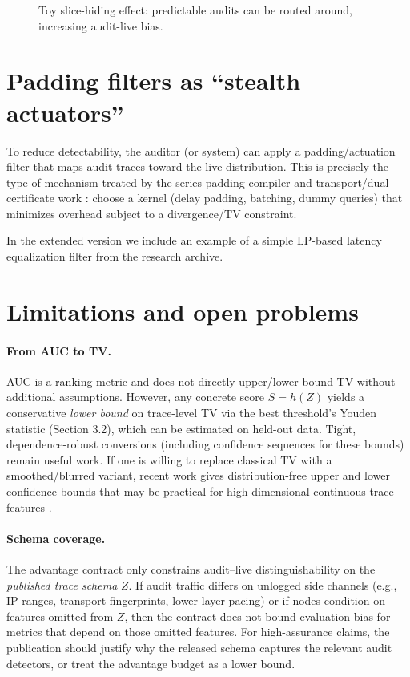 \documentclass[11pt]{article}
\newcommand{\TV}{\mathrm{TV}}
\begin{document}
\begin{figure}[t]
\centering
{}
\caption{Toy slice-hiding effect: predictable audits can be routed around, increasing audit-live bias.}
\label{fig:slice_hiding}
\end{figure}



\section{Padding filters as ``stealth actuators''}
To reduce detectability, the auditor (or system) can apply a padding/actuation filter that maps audit traces toward the live distribution.
This is precisely the type of mechanism treated by the series padding compiler and transport/dual-certificate work \cite{series:schedcompiler,series:knapsacktransport}:
choose a kernel (delay padding, batching, dummy queries) that minimizes overhead subject to a divergence/TV constraint.

In the extended version we include an example of a simple LP-based latency equalization filter from the research archive.



\section{Limitations and open problems}
\paragraph{From AUC to TV.}
AUC is a ranking metric and does not directly upper/lower bound $\TV$ without additional assumptions.
However, any concrete score $S=h(Z)$ yields a conservative \emph{lower bound} on trace-level TV via the best threshold's Youden statistic
(Section 3.2), which can be estimated on held-out data.
Tight, dependence-robust conversions (including confidence sequences for these bounds) remain useful work.
If one is willing to replace classical TV with a smoothed/blurred variant, recent work gives distribution-free upper and lower confidence bounds that may be practical for high-dimensional continuous trace features \cite{hore2026blurredtv}.

\paragraph{Schema coverage.}
The advantage contract only constrains audit--live distinguishability on the \emph{published trace schema} $Z$.
If audit traffic differs on unlogged side channels (e.g., IP ranges, transport fingerprints, lower-layer pacing) or if nodes condition on features omitted from $Z$,
then the contract does not bound evaluation bias for metrics that depend on those omitted features.
For high-assurance claims, the publication should justify why the released schema captures the relevant audit detectors, or treat the advantage budget as a lower bound.
\end{document}
